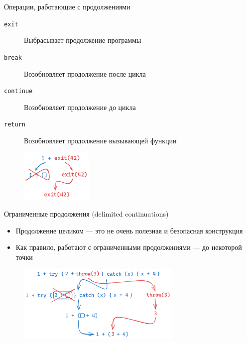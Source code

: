     \begin{frame}[fragile]{Операции, работающие с продолжениями}
        \vspace{1em}
        \begin{description}
            \item[\texttt{exit}] Выбрасывает продолжение программы
            \item[\texttt{break}] Возобновляет продолжение после цикла
            \item[\texttt{continue}] Возобновляет продолжение до цикла
            \item[\texttt{return}] Возобновляет продолжение вызывающей функции
        \end{description}
        \begin{figure}[h]
            \centering
            \includegraphics[width=0.31\textwidth]{figs/cont-exit}
        \end{figure}
    \end{frame}

    \begin{frame}[fragile]{Ограниченные продолжения (delimited continuations)}
        \begin{itemize}
            \item Продолжение целиком --- это не очень полезная и безопасная конструкция
            \item Как правило, работают с ограниченными продолжениями --- до некоторой точки
        \end{itemize}
        \begin{figure}[h]
            \centering
            \includegraphics[width=0.7\textwidth]{figs/cont-try-catch}
        \end{figure}
    \end{frame}

